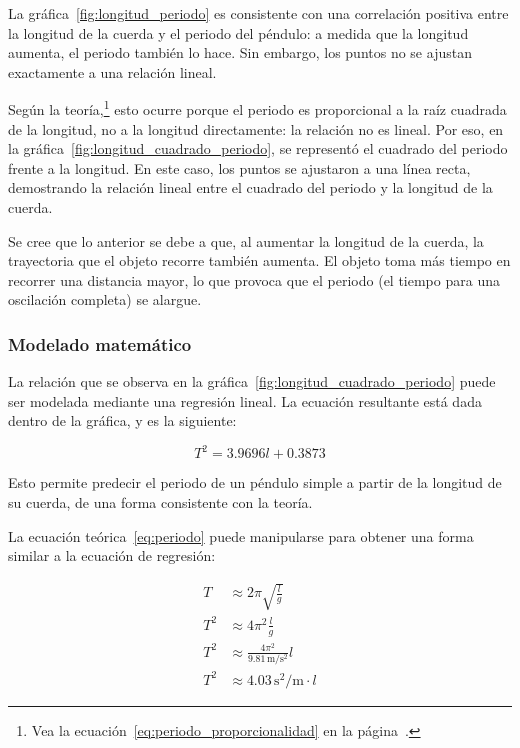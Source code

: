 \documentclass[twocolumn]{article}
\numberwithin{table}{section}
\begin{document}
La gráfica~\ref{fig:longitud_periodo} es consistente con una
correlación positiva entre la longitud de la cuerda y el periodo del
péndulo: a medida que la longitud aumenta, el periodo también lo hace. Sin
embargo, los puntos no se ajustan exactamente a una relación lineal.

Según la teoría,\footnote{Vea la
  ecuación~\eqref{eq:periodo_proporcionalidad} en la
página~\pageref{eq:periodo_proporcionalidad}.} esto ocurre porque el periodo es
proporcional a la raíz cuadrada de la longitud, no a la longitud
directamente: la relación no es lineal. Por eso, en la
gráfica~\ref{fig:longitud_cuadrado_periodo}, se representó el
cuadrado del periodo frente a la longitud. En este caso, los puntos
se ajustaron a una línea recta, demostrando la relación lineal entre
el cuadrado del periodo y la longitud de la cuerda.

Se cree que lo anterior se debe a que, al aumentar la longitud de la cuerda, la
trayectoria que el objeto recorre también aumenta. El objeto toma más
tiempo en recorrer una distancia mayor, lo que provoca que el periodo
(el tiempo para una oscilación completa) se alargue.

\subsubsection{Modelado matemático}

La relación que se observa en la gráfica~\ref{fig:longitud_cuadrado_periodo}
puede ser modelada mediante una regresión lineal. La ecuación resultante está
dada dentro de la gráfica, y es la siguiente:

\begin{equation}
  T^{2} = 3.9696l + 0.3873
\end{equation}

Esto permite predecir el periodo de un péndulo simple a partir de la longitud de
su cuerda, de una forma consistente con la teoría.

La ecuación teórica~\eqref{eq:periodo} puede manipularse para obtener una forma
similar a la ecuación de regresión:

\begin{align*}
  T &\approx 2\pi\sqrt{\frac{l}{g}} \\
  T^{2} &\approx 4\pi^{2}\frac{l}{g} \\
  T^{2} &\approx \frac{4\pi^{2}}{9.81\,\text{m/s$^{2}$}}l \\
  T^{2} &\approx 4.03\,\text{s$^{2}$/m} \cdot l
\end{align*}
\end{document}
